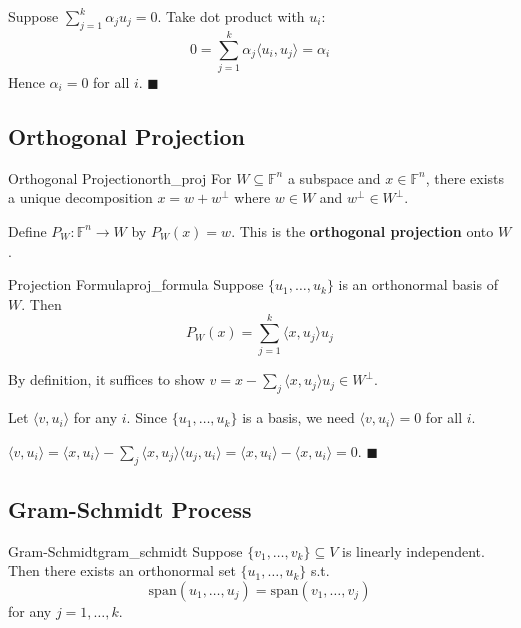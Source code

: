 \documentclass[11pt, letterpaper, openany]{book}
\renewenvironment{proof}[1][\proofname]{%
  \tcolorbox[blanker, breakable, left=1em,
    before skip=1em, after skip=1em,
    borderline west={2pt}{0pt}{MagicTeal!50},
    colback=MagicCream,
    before upper={\textcolor{MagicTeal}{\sffamily\bfseries #1.}\space}
  ]%
}{%
  \hfill\textcolor{MagicTeal}{\ensuremath{\blacksquare}}\endtcolorbox%
}
\begin{document}
\begin{proof}
Suppose $\sum_{j=1}^k \alpha_j u_j = 0$. Take dot product with $u_i$:
\[0 = \sum_{j=1}^k \alpha_j \langle u_i, u_j \rangle = \alpha_i\]
Hence $\alpha_i = 0$ for all $i$.
\end{proof}

\subsection{Orthogonal Projection}

\begin{defn}{Orthogonal Projection}{orth_proj}
For $W \subseteq \mathbb{F}^n$ a subspace and $x \in \mathbb{F}^n$, there exists a unique decomposition $x = w + w^\perp$ where $w \in W$ and $w^\perp \in W^\perp$.

Define $P_W: \mathbb{F}^n \to W$ by $P_W(x) = w$. This is the \textbf{orthogonal projection} onto $W$.
\end{defn}

\begin{thm}{Projection Formula}{proj_formula}
Suppose $\{u_1, \ldots, u_k\}$ is an orthonormal basis of $W$. Then
\[P_W(x) = \sum_{j=1}^k \langle x, u_j \rangle u_j\]
\end{thm}

\begin{proof}
By definition, it suffices to show $v = x - \sum_j \langle x, u_j \rangle u_j \in W^\perp$.

Let $\langle v, u_i \rangle$ for any $i$. Since $\{u_1, \ldots, u_k\}$ is a basis, we need $\langle v, u_i \rangle = 0$ for all $i$.

$\langle v, u_i \rangle = \langle x, u_i \rangle - \sum_j \langle x, u_j \rangle \langle u_j, u_i \rangle = \langle x, u_i \rangle - \langle x, u_i \rangle = 0$.
\end{proof}

\subsection{Gram-Schmidt Process}

\begin{thm}{Gram-Schmidt}{gram_schmidt}
Suppose $\{v_1, \ldots, v_k\} \subseteq V$ is linearly independent. Then there exists an orthonormal set $\{u_1, \ldots, u_k\}$ s.t.
\[\text{span}(u_1, \ldots, u_j) = \text{span}(v_1, \ldots, v_j)\]
for any $j = 1, \ldots, k$.
\end{thm}
\end{document}
